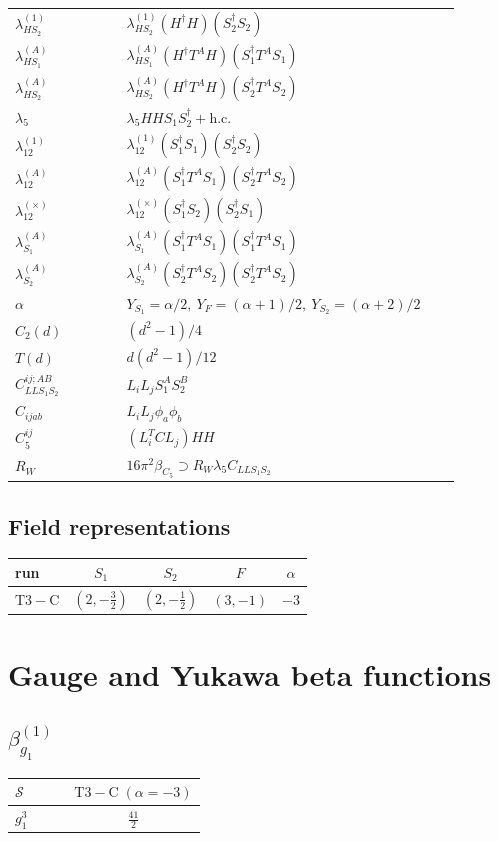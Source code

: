 \documentclass[9pt]{article}
\begin{document}
\begin{longtable}{@{}p{0.23\linewidth}p{0.69\linewidth}@{}}
$\lambda_{HS_2}^{(1)}$ & $\lambda_{HS_2}^{(1)}(H^\dagger H)(S_2^\dagger S_2)$ \\
$\lambda_{HS_1}^{(A)}$ & $\lambda_{HS_1}^{(A)}(H^\dagger T^AH)(S_1^\dagger T^AS_1)$ \\
$\lambda_{HS_2}^{(A)}$ & $\lambda_{HS_2}^{(A)}(H^\dagger T^AH)(S_2^\dagger T^AS_2)$ \\
$\lambda_5$ & $\lambda_5HHS_1S_2^\dagger+\mathrm{h.c.}$ \\
$\lambda_{12}^{(1)}$ & $\lambda_{12}^{(1)}(S_1^\dagger S_1)(S_2^\dagger S_2)$ \\
$\lambda_{12}^{(A)}$ & $\lambda_{12}^{(A)}(S_1^\dagger T^AS_1)(S_2^\dagger T^AS_2)$ \\
$\lambda_{12}^{(\times)}$ & $\lambda_{12}^{(\times)}(S_1^\dagger S_2)(S_2^\dagger S_1)$ \\
$\lambda_{S_1}^{(A)}$ & $\lambda_{S_1}^{(A)}(S_1^\dagger T^A S_1)(S_1^\dagger T^A S_1)$ \\
$\lambda_{S_2}^{(A)}$ & $\lambda_{S_2}^{(A)}(S_2^\dagger T^A S_2)(S_2^\dagger T^A S_2)$ \\
$\alpha$ & $Y_{S_1}=\alpha/2,\ Y_F=(\alpha+1)/2,\ Y_{S_2}=(\alpha+2)/2$ \\
$C_2(d)$ & $(d^2-1)/4$ \\
$T(d)$ & $d(d^2-1)/12$ \\
$C_{LLS_1S_2}^{ij;AB}$ & $L_iL_jS_1^AS_2^B$ \\
$C_{ijab}$ & $L_iL_j\phi_a\phi_b$ \\
$C_5^{ij}$ & $(L_i^TCL_j)HH$ \\
$R_W$ & $16\pi^2\beta_{C_5}\supset R_W\lambda_5C_{LLS_1S_2}$ \\
\bottomrule
\end{longtable}
\subsection*{Field representations}
\begin{longtable}{@{}lcccc@{}}
\toprule
run & $S_1$ & $S_2$ & $F$ & $\alpha$ \\
\midrule
$\mathrm{T3-C}$ & $(2,- \frac{3}{2})$ & $(2,- \frac{1}{2})$ & $(3,-1)$ & $-3$ \\
\bottomrule
\end{longtable}
\section*{Gauge and Yukawa beta functions}
\subsection*{$ \beta_{g_1}^{(1)} $}
\begin{longtable}{@{}p{0.38\linewidth}c@{}}
\toprule
$\mathcal{S}$ & $ \mathrm{T3-C}\;(\alpha=-3) $ \\
\midrule
$ g_1^3 $ & $ \frac{41}{2} $ \\
\bottomrule
\end{longtable}
\end{document}
